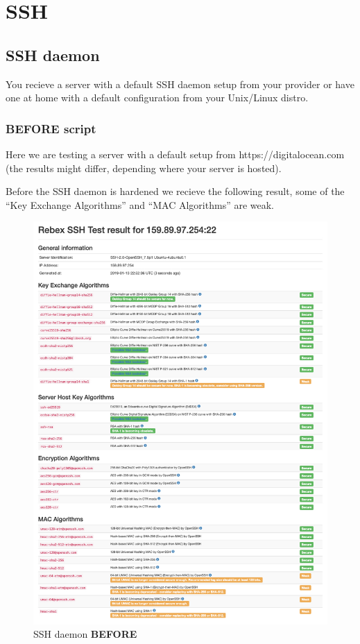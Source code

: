 \section{SSH}
\subsection{SSH daemon}
You recieve a server with a default SSH daemon setup from your provider or have one at home with a default configuration from your Unix/Linux distro.
\subsubsection{BEFORE script}
Here we are testing a server with a default setup from https://digitalocean.com (the results might differ, depending where your server is hosted).

Before the SSH daemon is hardened we recieve the following result, some of the \enquote{Key Exchange Algorithms} and \enquote{MAC Algorithms} are weak.

\begin{figure}[H]
        \centering
        \includegraphics[width=0.8\linewidth]{pics/score_SSH_before}
        \caption{SSH daemon \textbf{BEFORE} }
        \label{fig:scoresshbefore}
\end{figure}
\newpage


